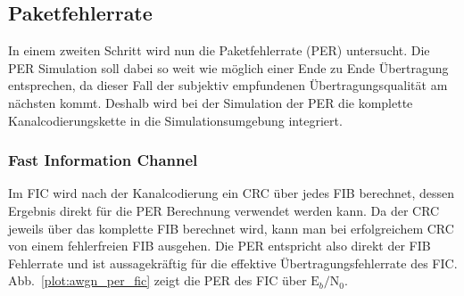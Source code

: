 \subsection{Paketfehlerrate}
In einem zweiten Schritt wird nun die Paketfehlerrate (PER) untersucht. Die PER Simulation soll dabei so weit wie möglich einer Ende zu Ende Übertragung entsprechen, da dieser Fall der subjektiv empfundenen Übertragungsqualität am nächsten kommt. Deshalb wird bei der Simulation der PER die komplette Kanalcodierungskette in die Simulationsumgebung integriert.\\
\subsubsection{Fast Information Channel}
Im FIC wird nach der Kanalcodierung ein CRC über jedes FIB berechnet, dessen Ergebnis direkt für die PER Berechnung verwendet werden kann. Da der CRC jeweils über das komplette FIB berechnet wird, kann man bei erfolgreichem CRC von einem fehlerfreien FIB ausgehen. Die PER entspricht also direkt der FIB Fehlerrate und ist aussagekräftig für die effektive Übertragungsfehlerrate des FIC. Abb.~\ref{plot:awgn_per_fic} zeigt die PER des FIC über $\text{E}_b/\text{N}_0$.\\

